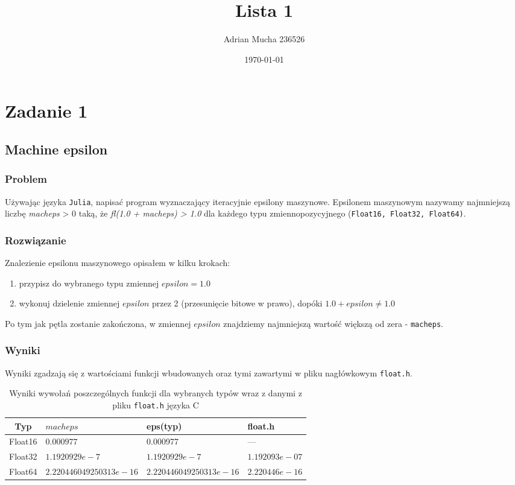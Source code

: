 \documentclass{article}
\title{Lista 1}
\author{Adrian Mucha 236526}
\date{\today}
\begin{document}
\maketitle

\section{Zadanie 1}
    \subsection{Machine epsilon}
    \subsubsection{Problem}
        Używając języka \texttt{Julia}, napisać program wyznaczający iteracyjnie epsilony maszynowe. Epsilonem maszynowym nazywamy najmniejszą liczbę \textit{macheps} > 0 taką, że \textit{fl(1.0 + macheps) > 1.0} dla każdego typu zmiennopozycyjnego (\texttt{Float16, Float32, Float64)}.
    \subsubsection{Rozwiązanie}
        Znalezienie epsilonu maszynowego opisałem w kilku krokach:
        \begin{enumerate}
            \item przypisz do wybranego typu zmiennej $epsilon = 1.0$
            \item wykonuj dzielenie zmiennej $epsilon$ przez 2 (przesunięcie bitowe w prawo), dopóki $1.0 + epsilon \neq 1.0$
        \end{enumerate}
        Po tym jak pętla zostanie zakończona, w zmiennej $epsilon$ znajdziemy najmniejszą wartość większą od zera - \texttt{macheps}.
        \subsubsection{Wyniki}
        Wyniki zgadzają się z wartościami funkcji wbudowanych oraz tymi zawartymi w pliku nagłówkowym \texttt{float.h}.
        {\small
        \begin{table}[h!]
        \begin{tabularx}{\textwidth}{c X X X}
            \hline
             Typ & $macheps$ & eps(typ) & float.h \\
             \hline
             Float16 & $0.000977$ & 0.000977 & --- \\
             Float32 & $1.1920929e-7$ & $1.1920929e-7$ & $1.192093e-07$ \\
             Float64 & $2.220446049250313e-16$ & $2.220446049250313e-16$ & $2.220446e-16$ \\
             \hline
        \end{tabularx}
        \caption{Wyniki wywołań poszczególnych funkcji dla wybranych typów wraz z danymi z pliku \texttt{float.h} języka C}
        \end{table}
        }
    
\end{document}
